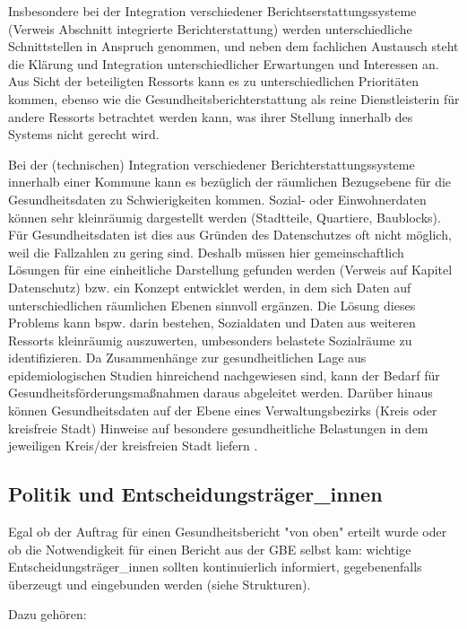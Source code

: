 \documentclass{article}
\begin{document}
Insbesondere bei der Integration verschiedener Berichtserstattungssysteme (Verweis Abschnitt integrierte Berichterstattung) werden unterschiedliche Schnittstellen in Anspruch genommen, und neben dem fachlichen Austausch steht die Klärung und Integration unterschiedlicher Erwartungen und Interessen an. Aus Sicht der beteiligten Ressorts kann es zu unterschiedlichen Prioritäten kommen, ebenso wie die Gesundheitsberichterstattung als reine Dienstleisterin für andere Ressorts betrachtet werden kann, was ihrer Stellung innerhalb des Systems nicht gerecht wird.

Bei der (technischen) Integration verschiedener Berichterstattungssysteme innerhalb einer Kommune kann es bezüglich der räumlichen Bezugsebene für die Gesundheitsdaten zu Schwierigkeiten kommen. Sozial- oder Einwohnerdaten können sehr kleinräumig dargestellt werden (Stadtteile, Quartiere, Baublocks). Für Gesundheitsdaten ist dies aus Gründen des Datenschutzes oft nicht möglich, weil die Fallzahlen zu gering sind. Deshalb müssen hier gemeinschaftlich Lösungen für eine einheitliche Darstellung gefunden werden (Verweis auf Kapitel Datenschutz) bzw. ein Konzept entwicklet werden, in dem sich Daten auf unterschiedlichen räumlichen Ebenen sinnvoll ergänzen. Die Lösung dieses Problems kann bspw. darin bestehen, Sozialdaten und Daten aus weiteren Ressorts kleinräumig auszuwerten, umbesonders belastete Sozialräume zu identifizieren. Da Zusammenhänge zur gesundheitlichen Lage aus epidemiologischen Studien hinreichend nachgewiesen sind, kann der Bedarf für Gesundheitsförderungsmaßnahmen daraus abgeleitet werden. Darüber hinaus können Gesundheitsdaten auf der Ebene eines Verwaltungsbezirks (Kreis oder kreisfreie Stadt) Hinweise auf besondere gesundheitliche Belastungen in dem jeweiligen Kreis/der kreisfreien Stadt liefern \autocite{RosenkötterNicoleundweitere2020}.


\subsection{Politik und Entscheidungsträger\_innen }\label{H3426797}



Egal ob der Auftrag für einen Gesundheitsbericht "von oben" erteilt wurde oder ob die Notwendigkeit für einen Bericht aus der GBE selbst kam: wichtige Entscheidungsträger\_innen sollten kontinuierlich informiert, gegebenenfalls überzeugt und eingebunden werden (siehe Strukturen). 


Dazu gehören:
\end{document}
